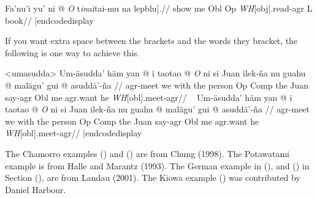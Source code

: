 \codedisplay
{}
\begingl
\gla Fa'nu'i yu' ni \nogloss{[[} @ {\it O} t{\it in\/}aitai-mu
\nogloss{{\it t\/}]} na {lepblu].}//
\glb show me Obl Op {\it WH\/}[obj].read-agr L book//
\endgl
\xe
|endcodedisplay

If you want extra space between the brackets and the words they
bracket, the following is one way to achieve this.

\framedisplay
\ex[everygla=,glhangstyle=normal]<umasudda>
\begingl
\gla Um-\"asudda' h\"am yan \nogloss{$[\,$} @ i taotao \nogloss{$[\,$} @
{\it O\/} ni si Juan ilek-\~na nu guahu \nogloss{$[\,$} @ mal\"agu' gui
\nogloss{$[\,$} @
asudd\"a'-\~na \nogloss{{\it t\/}$\,]]]]$.}//
\glb agr-meet we with the person Op Comp the Juan say-agr Obl me
agr.want he {\it WH\/}[obl].meet-agr//
\endgl
\xe
\endframedisplay
\codedisplay~
\ex[everygla=,glhangstyle=normal]
\begingl
\gla Um-\"asudda' h\"am yan \nogloss{$[\,$} @ i taotao \nogloss{$[\,$} @
{\it O\/} ni si Juan ilek-\~na nu guahu \nogloss{$[\,$} @ mal\"agu' gui
\nogloss{$[\,$} @ asudd\"a'-\~na \nogloss{{\it t\/}$\,]]]]$.}//
\glb agr-meet we with the person Op Comp the Juan say-agr Obl me
agr.want he {\it WH\/}[obl].meet-agr//
\endgl
\xe
|endcodedisplay

\medskip
The Chamorro examples () and () are
from Chung (1998). The Potawatami example is from Halle and Marantz
(1993). The German example in (), and
() in Section (), are from Landau
(2001). The Kiowa example () was contributed by Daniel
Harbour.

